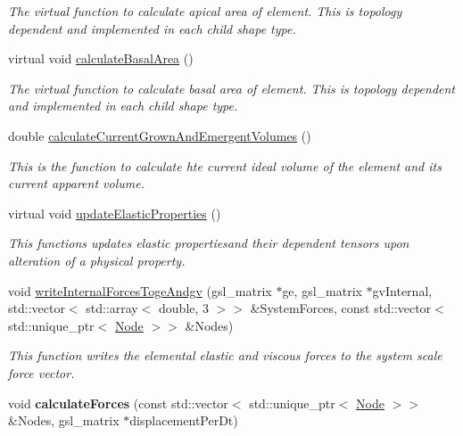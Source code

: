 \begin{DoxyCompactItemize}
\begin{DoxyCompactList}\small\item\em The virtual function to calculate apical area of element. This is topology dependent and implemented in each child shape type. \end{DoxyCompactList}\item 
\hypertarget{classShapeBase_a0bc80947335afbc181fca326e9a6b7fb}{}virtual void \hyperlink{classShapeBase_a0bc80947335afbc181fca326e9a6b7fb}{calculate\+Basal\+Area} ()\label{classShapeBase_a0bc80947335afbc181fca326e9a6b7fb}

\begin{DoxyCompactList}\small\item\em The virtual function to calculate basal area of element. This is topology dependent and implemented in each child shape type. \end{DoxyCompactList}\item 
double \hyperlink{classShapeBase_a58ffd31ed76797d558b085fe754cc4b3}{calculate\+Current\+Grown\+And\+Emergent\+Volumes} ()
\begin{DoxyCompactList}\small\item\em This is the function to calculate hte current ideal volume of the element and its current apparent volume. \end{DoxyCompactList}\item 
\hypertarget{classShapeBase_a018cc92b513ff64b919c374b0767cc1b}{}virtual void \hyperlink{classShapeBase_a018cc92b513ff64b919c374b0767cc1b}{update\+Elastic\+Properties} ()\label{classShapeBase_a018cc92b513ff64b919c374b0767cc1b}

\begin{DoxyCompactList}\small\item\em This functions updates elastic propertiesand their dependent tensors upon alteration of a physical property. \end{DoxyCompactList}\item 
\hypertarget{classShapeBase_a5e7d2fb83a97d57922c145dcc9be2f09}{}void \hyperlink{classShapeBase_a5e7d2fb83a97d57922c145dcc9be2f09}{write\+Internal\+Forces\+Toge\+Andgv} (gsl\+\_\+matrix $\ast$ge, gsl\+\_\+matrix $\ast$gv\+Internal, std\+::vector$<$ std\+::array$<$ double, 3 $>$$>$ \&System\+Forces, const std\+::vector$<$ std\+::unique\+\_\+ptr$<$ \hyperlink{classNode}{Node} $>$$>$ \&Nodes)\label{classShapeBase_a5e7d2fb83a97d57922c145dcc9be2f09}

\begin{DoxyCompactList}\small\item\em This function writes the elemental elastic and viscous forces to the system scale force vector. \end{DoxyCompactList}\item 
\hypertarget{classShapeBase_a7e69d4ab492428c657941fa3b9423cef}{}void {\bfseries calculate\+Forces} (const std\+::vector$<$ std\+::unique\+\_\+ptr$<$ \hyperlink{classNode}{Node} $>$$>$ \&Nodes, gsl\+\_\+matrix $\ast$displacement\+Per\+Dt)\label{classShapeBase_a7e69d4ab492428c657941fa3b9423cef}


\end{DoxyCompactItemize}
